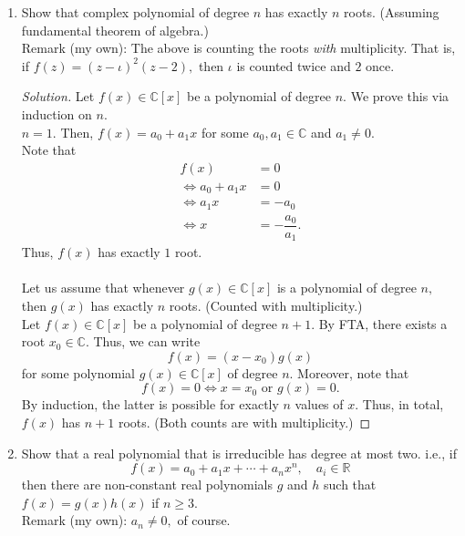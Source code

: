 \documentclass[12pt]{article}
\theoremstyle{definition}
\newenvironment{soln}{\begin{proof}[Solution]}{\end{proof}}
\begin{document}
\begin{enumerate}
	\item  Show that complex polynomial of degree $n$ has exactly $n$ roots. (Assuming fundamental theorem of algebra.)\\
	Remark (my own): The above is counting the roots \emph{with} multiplicity. That is, if $f(z) = (z - \iota)^2(z - 2),$ then $\iota$ is counted twice and $2$ once.
	\begin{soln}
		Let $f(x) \in \mathbb{C}[x]$ be a polynomial of degree $n.$
		We prove this via induction on $n.$\\
		$n = 1.$ Then, $f(x) = a_0 + a_1x$ for some $a_0, a_1 \in \mathbb{C}$ and $a_1 \neq 0.$\\
		Note that
		\begin{align*} 
			f(x) &= 0\\
			\iff a_0 + a_1x &= 0\\
			\iff a_1x &= -a_0\\
			\iff x &= -\dfrac{a_0}{a_1}.
		\end{align*}
		Thus, $f(x)$ has exactly $1$ root.\\~\\
		Let us assume that whenever $g(x) \in \mathbb{C}[x]$ is a polynomial of degree $n,$ then $g(x)$ has exactly $n$ roots. (Counted with multiplicity.)\\
		Let $f(x) \in \mathbb{C}[x]$ be a polynomial of degree $n + 1.$ By FTA, there exists a root $x_0 \in \mathbb{C}.$ Thus, we can write
		\begin{equation*} 
			f(x) = (x - x_0)g(x)
		\end{equation*}
		for some polynomial $g(x) \in \mathbb{C}[x]$ of degree $n.$ Moreover, note that 
		\begin{equation*} 
			f(x) = 0 \iff x = x_0 \text{ or } g(x) = 0.
		\end{equation*}
		By induction, the latter is possible for exactly $n$ values of $x.$ Thus, in total, $f(x)$ has $n + 1$ roots. (Both counts are with multiplicity.)
	\end{soln}
	\item Show that a real polynomial that is irreducible has degree at most two. i.e., if
	\begin{equation*} 
		f(x) = a_0 + a_1x + \cdots + a_nx^n, \quad a_i \in \mathbb{R}
	\end{equation*}
	then there are non-constant real polynomials $g$ and $h$ such that $f(x) = g(x)h(x)$ if $n \ge 3.$\\
	Remark (my own): $a_n \neq 0,$ of course.

\end{enumerate}
\end{document}
